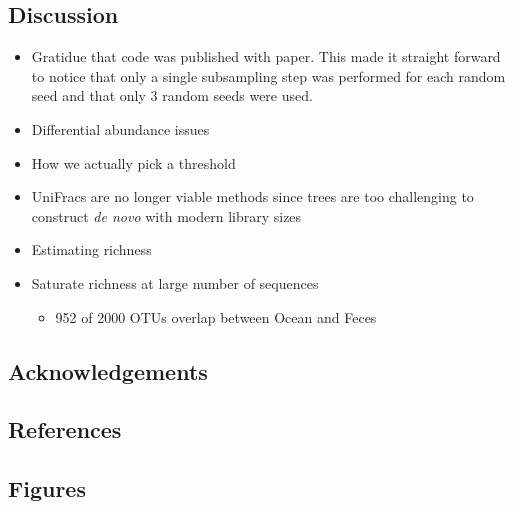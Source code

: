 \documentclass[
]{article}
\providecommand{\tightlist}{%
  \setlength{\itemsep}{0pt}\setlength{\parskip}{0pt}}
\newlength{\cslhangindent}
\newlength{\cslentryspacingunit} %
\newenvironment{CSLReferences}[2] %
 {%
  \setlength{\parindent}{0pt}
  \ifodd #1
  \let\oldpar\par
  \def\par{\hangindent=\cslhangindent\oldpar}
  \fi
  \setlength{\parskip}{#2\cslentryspacingunit}
 }%
 {}
\begin{document}
\hypertarget{discussion}{%
\subsection{Discussion}\label{discussion}}

\begin{itemize}
\tightlist
\item
  Gratidue that code was published with paper. This made it straight
  forward to notice that only a single subsampling step was performed
  for each random seed and that only 3 random seeds were used.
\item
  Differential abundance issues
\item
  How we actually pick a threshold
\item
  UniFracs are no longer viable methods since trees are too challenging
  to construct \emph{de novo} with modern library sizes
\item
  Estimating richness
\item
  Saturate richness at large number of sequences

  \begin{itemize}
  \tightlist
  \item
    952 of 2000 OTUs overlap between Ocean and Feces
  \end{itemize}
\end{itemize}

\hypertarget{acknowledgements}{%
\subsection{Acknowledgements}\label{acknowledgements}}

\newpage

\hypertarget{references}{%
\subsection{References}\label{references}}

\setlength{\parindent}{-0.25in}
\setlength{\leftskip}{0.25in}

\noindent

\hypertarget{refs}{}
\begin{CSLReferences}{0}{0}
\end{CSLReferences}


\setlength{\parindent}{0in}
\setlength{\leftskip}{0in}

\newpage

\hypertarget{figures}{%
\subsection{Figures}\label{figures}}
\end{document}
